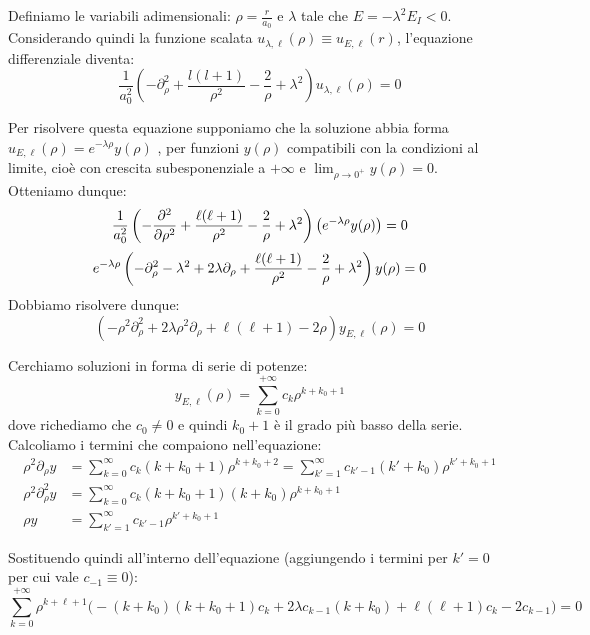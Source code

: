 Definiamo le variabili adimensionali: 
\(
\rho = \frac{r}{a_0}
\)
e \( \lambda \) tale che \( E = - \lambda^2 E_I < 0 \).
Considerando quindi la funzione scalata \( u_{\lambda, \ell}(\rho) \equiv u_{E,\ell}(r) \), l'equazione differenziale diventa:
\[
\frac{1}{a_0^2} \left( -\partial_\rho^2 + \frac{l(l+1)}{\rho^2} - \frac{2}{\rho} + \lambda^2 \right) u_{\lambda,\ell}(\rho) = 0
\]

Per risolvere questa equazione supponiamo che la soluzione abbia forma \(u_{E,\ell}(\rho)= e^{-\lambda\rho}y(\rho) \) ,
per funzioni \(y(\rho)\) compatibili con la condizioni al limite, cioè con crescita subesponenziale a \(+\infty\) e \(\lim_{\rho\to 0^+}y(\rho)=0\).\\
Otteniamo dunque:
\[
    \frac{1}{a_0^2} \left( - \frac{\partial^2}{\partial \rho^2} + \frac{\ell(\ell+1)}{\rho^2} - \frac{2}{\rho} + \lambda^2 \right) \left( e^{-\lambda \rho} y(\rho) \right) = 0 \\
\]
\[
    e^{-\lambda \rho} \left( -\partial_\rho^2 - \lambda^2 + 2\lambda \partial_\rho + \frac{\ell(\ell+1)}{\rho^2} - \frac{2}{\rho} + \lambda^2 \right) y(\rho) = 0\\
\]
Dobbiamo risolvere dunque:
\begin{equation}
    \left( -\rho^2 \partial_\rho^2 + 2\lambda \rho^2 \partial_\rho + \ell(\ell+1) - 2\rho \right) y_{E,\ell}(\rho) = 0
\end{equation}


Cerchiamo soluzioni in forma di serie di potenze:
\begin{equation}
    y_{E, \ell}(\rho)=  \sum_{k = 0}^{+\infty}c_k \rho^{k+k_0+1}
\end{equation}
dove richediamo che \(c_0 \neq 0\) e quindi \(k_0+1\) è il grado più basso della serie.
Calcoliamo i termini che compaiono nell'equazione:
\begin{align*}
\rho^2 \partial_\rho y &= \sum_{k=0}^{\infty} c_k (k+k_0+1) \rho^{k+k_0+2} = \sum_{k'=1}^{\infty} c_{k'-1} (k'+k_0) \rho^{k'+k_0+1} \\
\rho^2 \partial_\rho^2 y &= \sum_{k=0}^{\infty} c_k (k+k_0+1)(k+k_0) \rho^{k+k_0+1} \\
\rho y &= \sum_{k'=1}^{\infty} c_{k'-1} \rho^{k'+k_0+1}
\end{align*}

Sostituendo quindi all'interno dell'equazione (aggiungendo i termini per \(k' = 0\) per cui vale \(c_{-1}\equiv0\)):
\begin{equation}
    \sum_{k=0}^{+\infty} \rho^{k+\ell+1} \big( -(k+k_0)(k+k_0+1)c_k + 2\lambda c_{k-1}(k+k_0) + \ell(\ell+1)c_k - 2c_{k-1} \big) = 0
\end{equation}

